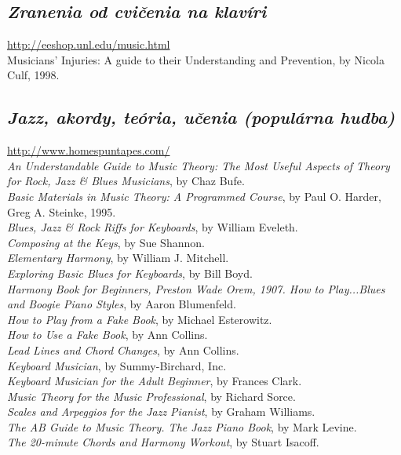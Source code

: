 \subsection*{\textit{Zranenia od cvičenia na klavíri}}
\href{http://eeshop.unl.edu/music.html}{http://eeshop.unl.edu/music.html}\\
Musicians' Injuries: A guide to their Understanding and Prevention, by Nicola Culf, 1998.

\subsection*{\textit{Jazz, akordy, teória, učenia (populárna hudba)}}
\href{http://www.homespuntapes.com/}{http://www.homespuntapes.com/}\\
\textit{An Understandable Guide to Music Theory: The Most Useful Aspects of Theory for Rock, Jazz \& Blues Musicians}, by Chaz Bufe.\\
\textit{Basic Materials in Music Theory: A Programmed Course}, by Paul O. Harder, Greg A. Steinke, 1995.\\
\textit{Blues, Jazz \& Rock Riffs for Keyboards}, by William Eveleth.\\
\textit{Composing at the Keys}, by Sue Shannon.\\
\textit{Elementary Harmony}, by William J. Mitchell.\\
\textit{Exploring Basic Blues for Keyboards}, by Bill Boyd.\\
\textit{Harmony Book for Beginners, Preston Wade Orem, 1907. How to Play...Blues and Boogie Piano Styles}, by Aaron Blumenfeld.\\
\textit{How to Play from a Fake Book}, by Michael Esterowitz.\\
\textit{How to Use a Fake Book}, by Ann Collins.\\
\textit{Lead Lines and Chord Changes}, by Ann Collins.\\
\textit{Keyboard Musician}, by Summy-Birchard, Inc.\\
\textit{Keyboard Musician for the Adult Beginner}, by Frances Clark.\\
\textit{Music Theory for the Music Professional}, by Richard Sorce.\\
\textit{Scales and Arpeggios for the Jazz Pianist}, by Graham Williams.\\
\textit{The AB Guide to Music Theory. The Jazz Piano Book}, by Mark Levine.\\ 
\textit{The 20-minute Chords and Harmony Workout}, by Stuart Isacoff.

